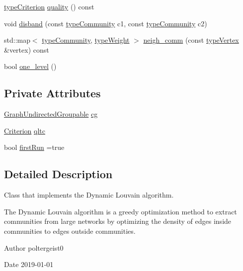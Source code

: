 \begin{DoxyCompactItemize}
\item 
\hyperlink{criterionInterface_8h_af71ff22f6355fd69a4a62104bfd59a83}{type\+Criterion} \hyperlink{classAlgorithmLouvain_a8c9b7694fff17eb5d8044cd26d7914e7}{quality} () const
\item 
void \hyperlink{classAlgorithmLouvain_a1e38f3c6a2df8b028328131b3dfceb94}{disband} (const \hyperlink{graphUndirectedGroupable_8h_a914da95c9ea7f14f4b7f875c36818556}{type\+Community} c1, const \hyperlink{graphUndirectedGroupable_8h_a914da95c9ea7f14f4b7f875c36818556}{type\+Community} c2)
\item 
std\+::map$<$ \hyperlink{graphUndirectedGroupable_8h_a914da95c9ea7f14f4b7f875c36818556}{type\+Community}, \hyperlink{edge_8h_a2e7ea3be891ac8b52f749ec73fee6dd2}{type\+Weight} $>$ \hyperlink{classAlgorithmLouvain_a78dfa81bd96f4036e44c17318501b6b7}{neigh\+\_\+comm} (const \hyperlink{edge_8h_a5fbd20c46956d479cb10afc9855223f6}{type\+Vertex} \&vertex) const
\item 
bool \hyperlink{classAlgorithmLouvain_a5370c76e777b7cbfddd1dccd865d9356}{one\+\_\+level} ()
\end{DoxyCompactItemize}
\subsection*{Private Attributes}
\begin{DoxyCompactItemize}
\item 
\hyperlink{classGraphUndirectedGroupable}{Graph\+Undirected\+Groupable} \hyperlink{classAlgorithmLouvain_aa98d18e2734216898993b4269f84ac7b}{cg}
\item 
\hyperlink{classCriterion}{Criterion} \hyperlink{classAlgorithmLouvain_ab3b6b2b7f256ca9962d685d6507fad90}{qltc}
\item 
bool \hyperlink{classAlgorithmLouvain_a193c2370556007f36b44e03e2df47c2f}{first\+Run} =true
\end{DoxyCompactItemize}


\subsection{Detailed Description}
Class that implements the Dynamic Louvain algorithm. 

The Dynamic Louvain algorithm is a greedy optimization method to extract communities from large networks by optimizing the density of edges inside communities to edges outside communities.

\begin{DoxyAuthor}{Author}
poltergeist0
\end{DoxyAuthor}
\begin{DoxyDate}{Date}
2019-\/01-\/01 
\end{DoxyDate}


